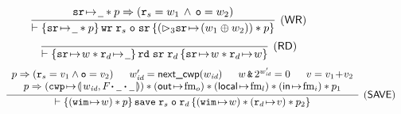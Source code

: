 \begin{figure*}[!thp]
{\begin{minipage}{1\linewidth}
			\[
				\infer[(\RULE{WR})]
				{
					\wfins{\regst{\sr}{\notCare} * p}{\cwr \; \reg{s} \; \oexp \; \sr}
					{(\dlyregst{3}{\sr}{(\word_1 \xorOP \word_2)} ) * p}
				}
				{
					\regst{\sr}{\notCare} * p \Rightarrow (\reg{s} = \word_1 \, \wedge \, \oexp = \word_2)
				}
			\]
            \[
                \infer[(\RULE{RD})]
                {
                    \wfins{\regst{\sr}{\word} * \regst{\reg{d}}{\notCare}}{\rd \; \sr \; \reg{d}}
                    {\regst{\sr}{\word} * \regst{\reg{d}}{\word}}
                }
                {}
            \]
%
%
			\[\begin{array}{l}
				\infer[(\RULE{SAVE})]
				{
					\wfins{(\regst{\regwim}{\word}) * p}
					{\csave \; \reg{s} \; \oexp \; \reg{d}}
					{(\regst{\regwim}{\word}) *
					(\regst{\reg{d}}{\val}) * p_2}
				}
				{
					\begin{array}{c}
						p \Rightarrow (\reg{s} = \val_1 \wedge \oexp = \val_2) \quad \; \;
						\cwp' = \precwp(\cwp) \quad \; \;
						\word \,\bitAND\, 2^{\cwp'} = 0 \quad \; \;
						\val = \val_1\!+\!\val_2 \\
						p \Rightarrow
						\left(\frmst{\cwp}{\Wstack \lstApp \, \notCare \, \lstApp \, \notCare}\right) *
						(\OutRegs{\fm_o}) *
                        (\LocalRegs{\fm_l}) *
                        (\InRegs{\fm_i})
                        * p_1 \\

\end{array}}
\end{array}\]
\end{minipage}}
\end{figure*}
